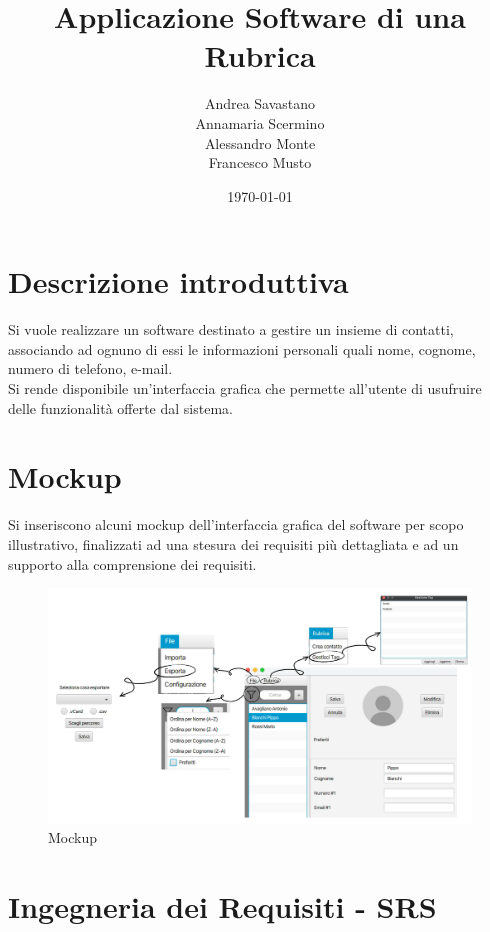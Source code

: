 \documentclass[12pt, a4paper]{article}
\title{\Huge Applicazione Software di una Rubrica}
\author{Andrea Savastano 
	\\ Annamaria Scermino
	\\ Alessandro Monte 
	\\ Francesco Musto}
\date{\today}
\newcommand{\disablelinkcolor}{%
	\hypersetup{linkcolor=black}%
}
\newcommand{\enablelinkcolor}{
	\hypersetup{
	    linkcolor=blue
	}
}
\begin{document}
	\fancyhf{}
	\thispagestyle{fancy}
	
	\maketitle
	\newpage
\disablelinkcolor
	\tableofcontents 
	\listoffigures
	
\enablelinkcolor %
	
	\newpage
	\section*{Descrizione introduttiva}
	Si vuole realizzare un software destinato a gestire un insieme di contatti, associando ad ognuno di essi le informazioni personali quali nome, cognome, numero di telefono, e-mail.
	\vspace{.2cm}\\Si rende disponibile un'interfaccia grafica che permette all'utente di usufruire delle funzionalità offerte dal sistema.
	
	\section*{Mockup}
	Si inseriscono alcuni mockup dell'interfaccia grafica del software per scopo illustrativo, finalizzati ad una stesura dei requisiti più dettagliata e ad un supporto alla comprensione dei requisiti.
\begin{figure}[h]
	\centering
	\includegraphics[width=\linewidth]{images/mockup.png}
	\caption{Mockup}
	\label{mockup}			
\end{figure}
	
	
	\newpage
	\fancyhf{} %
	\fancyhead[L]{\nouppercase{\leftmark}} %
	\section{Ingegneria dei Requisiti - SRS}
	
	
\end{document}
